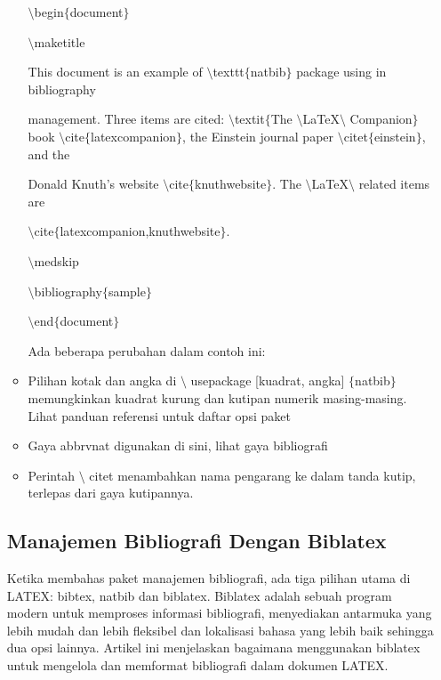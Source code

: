 \begin{itemize}
\begin{itemize}
$\setminus$begin$ \{ $document$ \} $\par

$\setminus$maketitle\par
\vspace{\baselineskip}
This document is an example of $\setminus$texttt$ \{ $natbib$ \} $ package using in bibliography \par

management. Three items are cited: $\setminus$textit$ \{ $The $\setminus$LaTeX$\setminus$ Companion$ \} $ book $\setminus$cite$ \{ $latexcompanion$ \} $, the Einstein journal paper $\setminus$citet$ \{ $einstein$ \} $, and the \par
\vspace{\baselineskip}
Donald Knuth's website $\setminus$cite$ \{ $knuthwebsite$ \} $. The $\setminus$LaTeX$\setminus$ related items are\par

$\setminus$cite$ \{ $latexcompanion,knuthwebsite$ \} $. \par

$\setminus$medskip\par

$\setminus$bibliography$ \{ $sample$ \} $\par

$\setminus$end$ \{ $document$ \} $\par
\vspace{\baselineskip}
\hspace*{0.5in}
\vspace{6pt}Ada beberapa perubahan dalam contoh ini:\par

	\item Pilihan kotak dan angka di $\setminus$ usepackage [kuadrat, angka] $ \{ $natbib$ \} $ memungkinkan kuadrat kurung dan kutipan numerik masing-masing. Lihat panduan referensi untuk daftar opsi paket\par

	\item Gaya abbrvnat digunakan di sini, lihat gaya bibliografi\par

	\item Perintah $\setminus$ citet menambahkan nama pengarang ke dalam tanda kutip, terlepas dari gaya kutipannya.
\end{itemize}\par
\vspace{\baselineskip}
\subsection{Manajemen Bibliografi Dengan Biblatex}
\vspace{\baselineskip}
Ketika membahas paket manajemen bibliografi, ada tiga pilihan utama di LATEX: bibtex, natbib dan biblatex. Biblatex adalah sebuah program modern untuk memproses informasi bibliografi, menyediakan antarmuka yang lebih mudah dan lebih fleksibel dan lokalisasi bahasa yang lebih baik sehingga dua opsi lainnya. Artikel ini menjelaskan bagaimana menggunakan biblatex untuk mengelola dan memformat bibliografi dalam dokumen LATEX.\par


\end{itemize}
